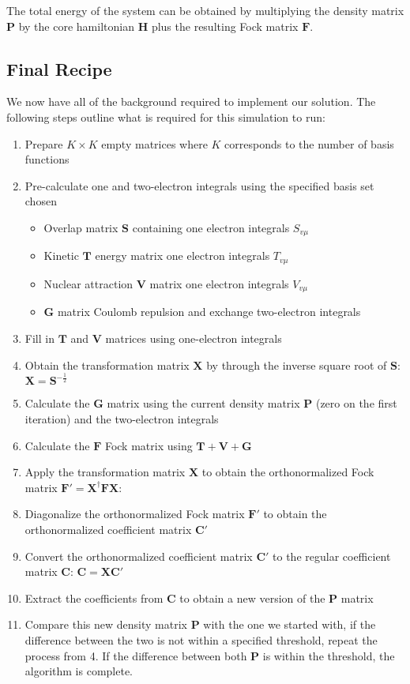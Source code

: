 \documentclass[10pt, oneside, letterpaper]{article}
\begin{document}
The total energy of the system can be obtained by multiplying the density matrix $\bm{P}$ by the core hamiltonian $\bm{H}$ plus the resulting Fock matrix $\bm{F}$.

\subsection{Final Recipe}

We now have all of the background required to implement our solution. The following steps outline what is required for this simulation to run:

\begin{enumerate}
    \item Prepare $K \times K$ empty matrices where $K$ corresponds to the number of basis functions
    \item Pre-calculate one and two-electron integrals using the specified basis set chosen
      \begin{itemize}
        \item Overlap matrix $\bm{S}$ containing one electron integrals $S_{v\mu}$
        \item Kinetic $\bm{T}$ energy matrix one electron integrals $T_{v\mu}$
        \item Nuclear attraction $\bm{V}$ matrix one electron integrals $V_{v\mu}$
        \item $\bm{G}$ matrix Coulomb repulsion and exchange two-electron integrals
      \end{itemize}
    \item Fill in $\bm{T}$ and $\bm{V}$ matrices using one-electron integrals
    \item Obtain the transformation matrix $\bm{X}$ by through the inverse square root of $\bm{S}$: $\bm{X} = \bm{S}^{-\frac{1}{2}}$
    \item Calculate the $\bm{G}$ matrix using the current density matrix $\bm{P}$ (zero on the first iteration) and the two-electron integrals
    \item Calculate the $\bm{F}$ Fock matrix using $\bm{T} + \bm{V} + \bm{G}$
    \item Apply the transformation matrix $\bm{X}$ to obtain the orthonormalized Fock matrix $\bm{F}' = \bm{X}^\dagger\bm{F}\bm{X}$:
    \item Diagonalize the orthonormalized Fock matrix $\bm{F}'$ to obtain the orthonormalized coefficient matrix $\bm{C}'$
    \item Convert the orthonormalized coefficient matrix $\bm{C}'$ to the regular coefficient matrix $\bm{C}$: $\bm{C} = \bm{X}\bm{C}'$
    \item Extract the coefficients from $\bm{C}$ to obtain a new version of the $\bm{P}$ matrix
    \item Compare this new density matrix $\bm{P}$ with the one we started with, if the difference between the two is not within a specified threshold, repeat the process from 4. If the difference between both $\bm{P}$ is within the threshold, the algorithm is complete.

\end{enumerate}
\end{document}
